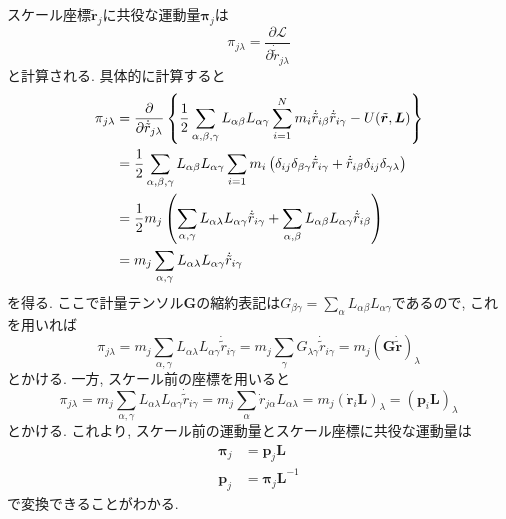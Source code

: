 スケール座標$\tilde{\bm{r}}_{j}$に共役な運動量$\bm{\pi}_{j}$は
\begin{equation}
  \pi_{j\lambda} = \frac{\partial \mathcal{L}}{\partial \dot{\tilde{r}}_{j\lambda}}
\end{equation}
と計算される. 具体的に計算すると
\begin{align}
  \pi_{j\lambda}
 &=
  \frac{\partial}{\partial \dot{\tilde{r}}_{j\lambda}}
  \left\{
        \frac{1}{2}
        \sum_{\alpha,\beta,\gamma} L_{\alpha\beta} L_{\alpha\gamma}
        \sum_{i=1}^{N} m_{i} \dot{\tilde{r}}_{i\beta} \dot{\tilde{r}}_{i\gamma}
        -
        U(\tilde{\bm{r}}, \bm{L})
  \right\}
  \\
  \notag
  &=
  \frac{1}{2}
  \sum_{\alpha,\beta,\gamma} L_{\alpha\beta} L_{\alpha\gamma}
  \sum_{i=1} m_{i}
  \left(
         \delta_{ij}\delta_{\beta\gamma} \dot{\tilde{r}}_{i\gamma}
       + \dot{\tilde{r}}_{i\beta} \delta_{ij}\delta_{\gamma\lambda}
  \right)
  \\
  \notag
  &=
  \frac{1}{2} m_{j}
  \left(
    \sum_{\alpha,\gamma} L_{\alpha\lambda} L_{\alpha\gamma} \dot{\tilde{r}}_{i\gamma}
  + \sum_{\alpha,\beta}  L_{\alpha\beta}   L_{\alpha\gamma} \dot{\tilde{r}}_{i\beta}
  \right)
  \\
  \notag
  &=
  m_{j}
  \notag
  \sum_{\alpha,\gamma} L_{\alpha\lambda} L_{\alpha\gamma} \dot{\tilde{r}}_{i\gamma}
\end{align}
を得る.
ここで計量テンソル$\bm{G}$の縮約表記は$G_{\beta\gamma} = \sum_{\alpha}L_{\alpha\beta}L_{\alpha\gamma}$であるので, これを用いれば
\begin{equation}
  \pi_{j\lambda}
  =
  m_{j}
  \sum_{\alpha,\gamma} L_{\alpha\lambda} L_{\alpha\gamma} \dot{\tilde{r}}_{i\gamma}
  =
  m_{j}
  \sum_{\gamma} G_{\lambda\gamma} \dot{\tilde{r}}_{i\gamma}
  =
  m_{j} (\bm{G} \dot{\tilde{\bm{r}}})_{\lambda}
\end{equation}
とかける. 一方, スケール前の座標を用いると
\begin{equation}
  \pi_{j\lambda}
  =
  m_{j}
  \sum_{\alpha,\gamma} L_{\alpha\lambda} L_{\alpha\gamma} \dot{\tilde{r}}_{i\gamma}
  =
  m_{j}
  \sum_{\alpha} \dot{r}_{j\alpha} L_{\alpha\lambda}
  =
  m_{j} (\dot{\bm{r}}_{i} \bm{L})_{\lambda}
  =
  (\bm{p}_{i} \bm{L})_{\lambda}
\end{equation}
とかける. これより, スケール前の運動量とスケール座標に共役な運動量は
\begin{align}
  \bm{\pi}_{j} &= \bm{p}_{j}   \bm{L}      \label{Eq:Momentum-pi-p} \\
  \bm{p}_{j}   &= \bm{\pi}_{j} \bm{L}^{-1} \label{Eq:Momentum-p-pi}
\end{align}
で変換できることがわかる. 

